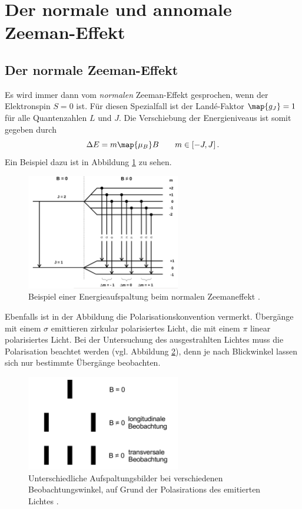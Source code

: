 \section{Der normale und annomale Zeeman-Effekt}

\subsection{Der normale Zeeman-Effekt}
Es wird immer dann vom \emph{normalen} Zeeman-Effekt gesprochen, wenn der Elektronspin $S=0$ ist.
Für diesen Spezialfall ist der Landé-Faktor $\map{g_J}=1$ für alle Quantenzahlen $L$ und $J$. %
Die Verschiebung der Energieniveaus ist somit gegeben durch
\begin{equation}
  \label{eq: energie_normaler_zeeman}
  \Delta E=m\map{\mu_B}B \qquad m\in\left[-J,J\right].
\end{equation}
Ein Beispiel dazu ist in Abbildung \ref{fig: energie_normaler_zeeman} zu sehen.
\FloatBarrier
\begin{figure}[h]
  \centering
  \includegraphics[width=0.6\textwidth]{pics/enerieaufspaltung_normaler_zeeman.png}
  \caption{Beispiel einer Energieaufspaltung beim normalen Zeemaneffekt \cite{anleitung27}.}
  \label{fig: energie_normaler_zeeman}
\end{figure}
\FloatBarrier
Ebenfalls ist in der Abbildung die Polarisationskonvention vermerkt.
Übergänge mit einem $\sigma$ emittieren zirkular polarisiertes Licht, die mit einem %
$\pi$ linear polarisiertes Licht.
Bei der Untersuchung des ausgestrahlten Lichtes muss die Polarisation beachtet werden (vgl. Abbildung \ref{fig: beobachtung_energie}), denn
je nach Blickwinkel lassen sich nur bestimmte Übergänge beobachten.
\FloatBarrier
\begin{figure}[h]
  \centering
  \includegraphics[width=0.6\textwidth]{pics/beobachtung_energie.png}
  \caption{Unterschiedliche Aufspaltungsbilder bei verschiedenen Beobachtungswinkel, auf Grund der Polasirations des emitierten Lichtes \cite{anleitung27}.}
  \label{fig: beobachtung_energie}
\end{figure}
